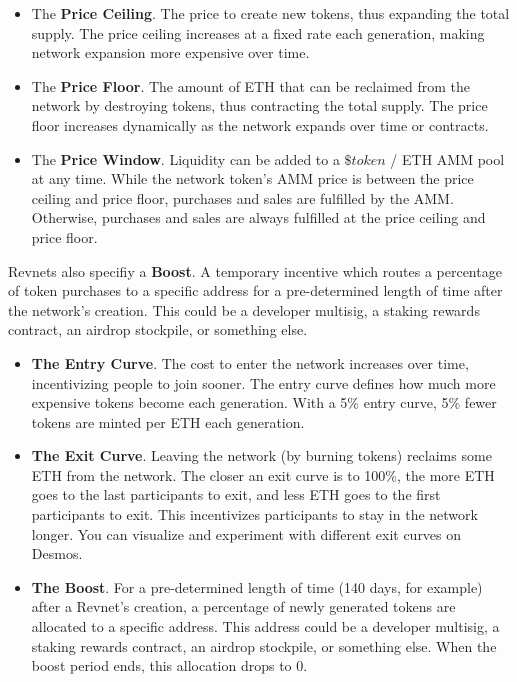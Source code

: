 \documentclass{article}
\begin{document}
\begin{itemize}
  \item The \textbf{Price Ceiling}. The price to create new tokens, thus expanding the total supply. The price ceiling increases at a fixed rate each generation, making network expansion more expensive over time.
  \item The \textbf{Price Floor}. The amount of ETH that can be reclaimed from the network by destroying tokens, thus contracting the total supply. The price floor increases dynamically as the network expands over time or contracts.
  \item The \textbf{Price Window}. Liquidity can be added to a $\$token$ / ETH AMM pool at any time. While the network token's AMM price is between the price ceiling and price floor, purchases and sales are fulfilled by the AMM. Otherwise, purchases and sales are always fulfilled at the price ceiling and price floor.
\end{itemize}

Revnets also specifiy a \textbf{Boost}. A temporary incentive which routes a percentage of token purchases to a specific address for a pre-determined length of time after the network's creation. This could be a developer multisig, a staking rewards contract, an airdrop stockpile, or something else.

\begin{itemize}
  \item \textbf{The Entry Curve}. The cost to enter the network increases over time, incentivizing people to join sooner. The entry curve defines how much more expensive tokens become each generation. With a 5\% entry curve, 5\% fewer tokens are minted per ETH each generation.
  \item \textbf{The Exit Curve}. Leaving the network (by burning tokens) reclaims some ETH from the network. The closer an exit curve is to 100\%, the more ETH goes to the last participants to exit, and less ETH goes to the first participants to exit. This incentivizes participants to stay in the network longer. You can visualize and experiment with different exit curves on Desmos.
  \item \textbf{The Boost}. For a pre-determined length of time (140 days, for example) after a Revnet's creation, a percentage of newly generated tokens are allocated to a specific address. This address could be a developer multisig, a staking rewards contract, an airdrop stockpile, or something else. When the boost period ends, this allocation drops to 0.
\end{itemize}
\end{document}
